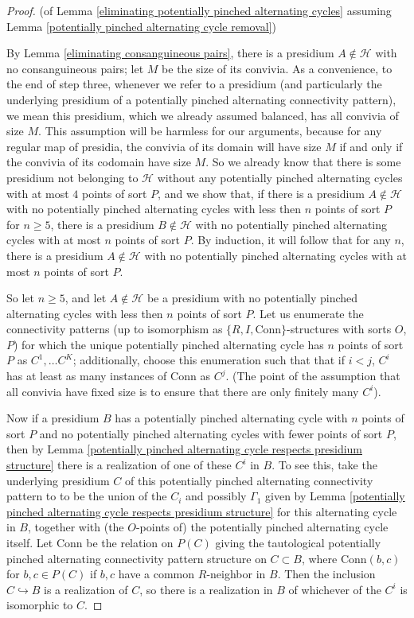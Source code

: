 \documentclass{amsart}
\theoremstyle{definition}
\theoremstyle{remark}
\numberwithin{equation}{section}
\begin{document}
\begin{proof}
     (of Lemma \ref{eliminating potentially pinched alternating cycles} assuming Lemma \ref{potentially pinched alternating cycle removal})


     By Lemma \ref{eliminating consanguineous pairs}, there is a presidium $A \notin \mathcal{H}$ with no consanguineous pairs; let $M$ be the size of its convivia. As a convenience, to the end of step three, whenever we refer to a presidium (and particularly the underlying presidium of a potentially pinched alternating connectivity pattern), we mean this presidium, which we already assumed balanced, has all convivia of size $M$.  This assumption will be harmless for our arguments, because for any regular map of presidia, the convivia of its domain will have size $M$ if and only if the convivia of its codomain have size $M$. So we already know that there is some presidium not belonging to $\mathcal{H}$ without any potentially pinched alternating cycles with at most $4$ points of sort $P$, and we show that, if there is a presidium $A \notin \mathcal{H}$ with no potentially pinched alternating cycles with less then $n$ points of sort $P$ for $n \geq 5$, there is a presidium $B \notin \mathcal{H}$ with no potentially pinched alternating cycles with at most $n$ points of sort $P$. By induction, it will follow that for any $n$, there is a presidium $A \notin \mathcal{H}$ with no potentially pinched alternating cycles with at most $n$ points of sort $P$.
     
     So let $n \geq 5$, and let $A \notin \mathcal{H}$ be a presidium with no potentially pinched alternating cycles with less then $n$ points of sort $P$. Let us enumerate the connectivity patterns (up to isomorphism as $\{R, I, \mathrm{Conn}\}$-structures with sorts $O$, $P$) for which the unique potentially pinched alternating cycle has $n$ points of sort $P$ as $C^{1}, \ldots C^{K}$; additionally, choose this enumeration such that that if $i < j$, $C^{i}$ has at least as many instances of $\mathrm{Conn}$ as $C^{j}$. (The point of the assumption that all convivia have fixed size is to ensure that there are only finitely many $C^{i}$).
     
     Now if a presidium $B$ has a potentially pinched alternating cycle with $n$ points of sort $P$ and no potentially pinched alternating cycles with fewer points of sort $P$, then by Lemma \ref{potentially pinched alternating cycle respects presidium structure} there is a realization of one of these $C^i$ in $B$. To see this, take the underlying presidium $C$ of this potentially pinched alternating connectivity pattern to  to be the union of the $C_{i}$ and possibly $\Gamma_{1}$ given by Lemma \ref{potentially pinched alternating cycle respects presidium structure} for this alternating cycle in $B$, together with (the $O$-points of) the potentially pinched alternating cycle itself. Let $\mathrm{Conn}$ be the relation on $P(C)$ giving the tautological potentially pinched alternating connectivity pattern structure on $C \subset B$, where $\mathrm{Conn}(b, c)$ for $b, c \in P(C)$ if $b, c $ have a common $R$-neighbor in $B$. Then the inclusion $C \hookrightarrow B$ is a realization of $C$, so there is a realization in $B$ of whichever of the $C^{i}$  is isomorphic to $C$.


\end{proof}
\end{document}
